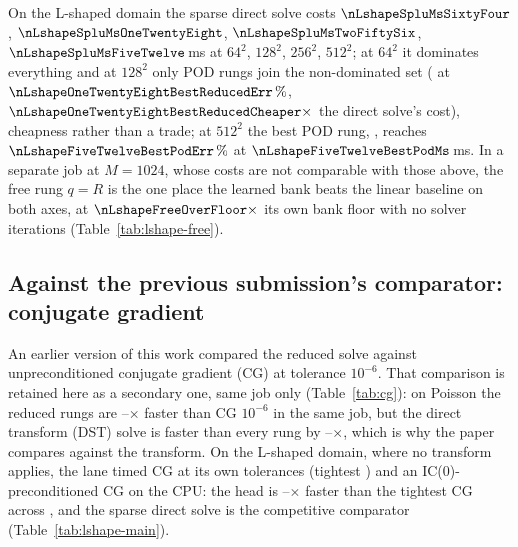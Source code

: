 \begin{table}[h]
\centering
\caption{Literal and amended linear-PDE criteria. Wave rows ask whether
the linear endpoint is at least as accurate as every head rung; the
amended test permits the listed tie band. Poisson rows ask whether the
collapse claim is falsified; the observed quantity is the full ladder's
maximum/minimum query-cost ratio. Amendments followed earlier
observations, as described in the text; ``yes'' has the meaning of the
criterion in its row.}
\label{tab:linear-protocol}

\end{table}

On the L-shaped domain
the sparse direct solve costs $\nLshapeSpluMsSixtyFour$,
$\nLshapeSpluMsOneTwentyEight$, $\nLshapeSpluMsTwoFiftySix$,
$\nLshapeSpluMsFiveTwelve$\,ms at $64^2$, $128^2$, $256^2$, $512^2$; at
$64^2$ it dominates everything and at $128^2$ only POD rungs join the
non-dominated set (\nLshapeOneTwentyEightBestReduced{} at
$\nLshapeOneTwentyEightBestReducedErr\,\%$,
$\nLshapeOneTwentyEightBestReducedCheaper\times$ the direct solve's cost),
cheapness rather than a trade; at $512^2$ the best POD rung,
\nLshapeFiveTwelveBestPod{}, reaches $\nLshapeFiveTwelveBestPodErr\,\%$ at
$\nLshapeFiveTwelveBestPodMs$\,ms. In a separate job at $M=1024$, whose
costs are not comparable with those above, the free rung $q=R$ is the one
place the learned bank beats the linear baseline on both axes, at
$\nLshapeFreeOverFloor\times$ its own bank floor with no solver iterations
(Table~\ref{tab:lshape-free}).

\subsection{Against the previous submission's comparator: conjugate gradient}
\label{app:extended:cg}
An earlier version of this work compared the reduced solve against
unpreconditioned conjugate gradient (CG) at tolerance $10^{-6}$. That
comparison is retained here as a secondary one, same job only
(Table~\ref{tab:cg}): on Poisson the reduced rungs are
\nCgPoissonSpeedupMin--\nCgPoissonSpeedupMax$\times$ faster than CG
$10^{-6}$ in the same job, but the direct transform (DST) solve is faster
than every rung by \nCgPoissonDstFasterMin--\nCgPoissonDstFasterMax$\times$,
which is why the paper compares against the transform. On the L-shaped
domain, where no transform applies, the lane timed CG at its own
tolerances (tightest \nCgLshapeCgTol) and an IC(0)-preconditioned CG on
the CPU: the head is \nCgLshapeSpeedupMin--\nCgLshapeSpeedupMax$\times$
faster than the tightest CG across \nCgLshapeMeshes, and the sparse direct
solve is the competitive comparator (Table~\ref{tab:lshape-main}).


